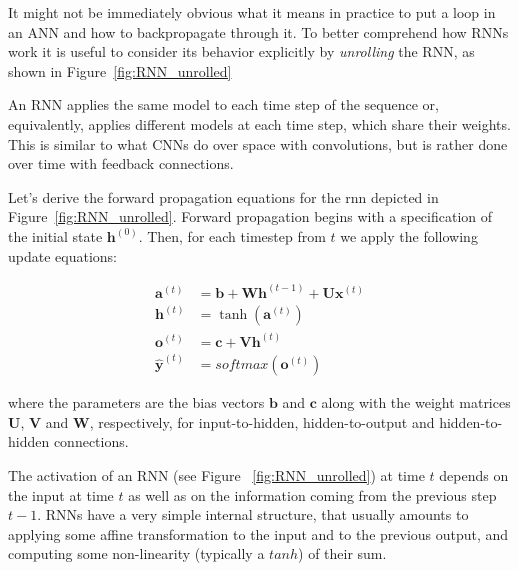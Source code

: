 It might not be immediately obvious what it means in practice to put a loop in an ANN and how to backpropagate through it. To better comprehend how RNNs work it is useful to consider its behavior explicitly by \emph{unrolling} the RNN, as shown in Figure~\ref{fig:RNN_unrolled}

An RNN applies the same model to each time step of the sequence or, equivalently, applies different models at each time step, which share their weights. This is similar to what CNNs do over space with convolutions, but is rather done over time with feedback connections.

Let's derive the forward propagation equations for the \gls{rnn} depicted in Figure~\ref{fig:RNN_unrolled}. Forward propagation begins with a specification of the initial state $ \textbf{h}^{(0)} $. Then, for each timestep from $ t $ we apply the following update equations:

\begin{equation} \label{rnn_unroll}
\begin{split}
	\textbf{a}^{(t)} &= \textbf{b} + \textbf{W}\textbf{h}^{(t-1)} + \textbf{U}\textbf{x}^{(t)} \\
	\textbf{h}^{(t)}&=\tanh(\textbf{a}^{(t)})\\
	\textbf{o}^{(t)}&= \textbf{c} + \textbf{V}\textbf{h}^{(t)} \\
	{\hat{\textbf{y}}}^{(t)} &= softmax(\textbf{o}^{(t)})
\end{split}
\end{equation}

where the parameters are the bias vectors $ \textbf{b} $ and $ \textbf{c} $ along with the weight matrices $\textbf{U}$, $\textbf{V}$ and $\textbf{W}$, respectively, for input-to-hidden, hidden-to-output and hidden-to-hidden connections.

The activation of an RNN (see Figure ~\ref{fig:RNN_unrolled}) at time $t$ depends on the input at time $t$ as well as on the information coming from the previous step $t-1$. RNNs have a very simple internal structure, that usually amounts to applying some affine transformation to the input and to the previous output, and computing some non-linearity (typically a $tanh$) of their sum.

